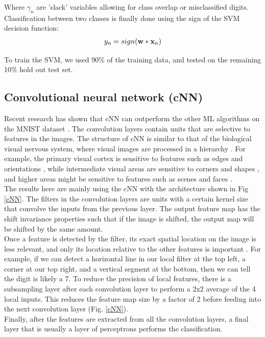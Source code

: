 \documentclass[conference]{IEEEtran}
\begin{document}
Where $\gamma_n$ are 'slack' variables allowing for class overlap or misclassified digits. Classification between two classes is finally done using the sign of the SVM decision function:
\begin{align*}
y_n=sign(\bold{w}*\bold{x}_n)
\end{align*}

To train the SVM, we used 90\% of the training data, and tested on the remaining 10\% hold out test set.

\subsection{Convolutional neural network (cNN)}
Recent research has shown that cNN can outperform the other ML algorithms on the MNIST dataset \cite{lecun-98}. The convolution layers contain units that are selective to features in the images. The structure of cNN is similar to that of the biological visual nervous system, where visual images are processed in a hierarchy \cite{citeulike:13382577}. For example, the primary visual cortex is sensitive to features such as edges and orientations \cite{hubel_receptive_1962}, while intermediate visual areas are sensitive to corners and shapes \cite{Engel97retinotopicorganization}, and higher areas might be sensitive to features such as scenes and faces \cite{gross:jnp72}.\\
The results here are mainly using the cNN with the architecture shown in Fig \ref{cNN}. The filters in the convolution layers are units with a certain kernel size that convolve the inputs from the previous layer. The output feature map has the shift invariance properties such that if the image is shifted, the output map will be shifted by the same amount.\\
Once a feature is detected by the filter, its exact spatial location on the image is less relevant, and only its location relative to the other features is important \cite{lecun-98}. For example, if we can detect a horizontal line in our local filter at the top left, a corner at our top right, and a vertical segment at the bottom, then we can tell the digit is likely a 7. To reduce the precision of local features, there is a subsampling layer after each convolution layer to perform a 2x2 average of the 4 local inputs. This reduces the feature map size by a factor of 2 before feeding into the next convolution layer (Fig. \ref{cNN}).\\
Finally, after the features are extracted from all the convolution layers, a final layer that is usually a layer of perceptrons performs the classification. 
\end{document}
